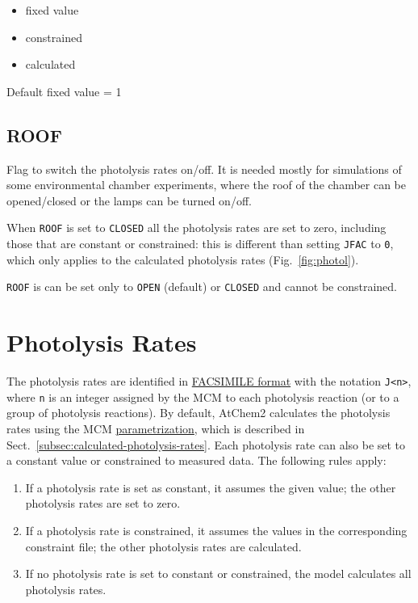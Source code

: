 \begin{itemize}
\item fixed value
\item constrained
\item calculated
\end{itemize}

Default fixed value = 1

\subsection{ROOF} \label{subsec:roof}

Flag to switch the photolysis rates on/off. It is needed mostly for
simulations of some environmental chamber experiments, where the roof
of the chamber can be opened/closed or the lamps can be turned on/off.

When \texttt{ROOF} is set to \texttt{CLOSED} all the photolysis rates
are set to zero, including those that are constant or constrained:
this is different than setting \texttt{JFAC} to \texttt{0}, which only
applies to the calculated photolysis rates (Fig.~\ref{fig:photol}).

\texttt{ROOF} is can be set only to \texttt{OPEN} (default) or
\texttt{CLOSED} and cannot be constrained.

\section{Photolysis Rates} \label{sec:photolysis-rates}

The photolysis rates are identified in
\hyperref[subsec:facsimile-format]{FACSIMILE format} with the notation
\verb|J<n>|, where \texttt{n} is an integer assigned by the MCM to
each photolysis reaction (or to a group of photolysis reactions). By
default, AtChem2 calculates the photolysis rates using the MCM
\href{http://mcm.leeds.ac.uk/MCM/parameters/photolysis_param.htt}{parametrization},
which is described in Sect.~\ref{subsec:calculated-photolysis-rates}.
Each photolysis rate can also be set to a constant value or
constrained to measured data. The following rules apply:

\begin{enumerate}
\item If a photolysis rate is set as constant, it assumes the given
  value; the other photolysis rates are set to zero.
\item If a photolysis rate is constrained, it assumes the values in
  the corresponding constraint file; the other photolysis rates are
  calculated.
\item If no photolysis rate is set to constant or constrained, the
  model calculates all photolysis rates.
\end{enumerate}

